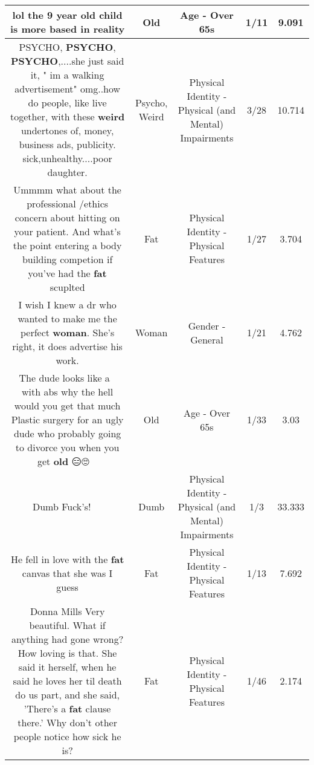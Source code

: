 \documentclass[11pt]{article}
\newlength\mylength
\begin{document}
\begin{center}
\begin{longtable}{|C{.65\mylength}|C{.30\mylength}|C{.12\mylength}|C{.12\mylength}|C{.12\mylength}|}
  \small lol the 9 year \textbf{old} child is more based in reality\normalsize   & Old & Age - Over 65s & 1/11 & 9.091 \\  \hline
  \small PSYCHO, \textbf{PSYCHO}, \textbf{PSYCHO},....she just said it, " im a walking advertisement" omg..how do people, like live together, with these \textbf{weird} undertones of, money, business ads, publicity. sick,unhealthy....poor daughter.\normalsize   & Psycho, Weird & Physical Identity - Physical (and Mental) Impairments & 3/28 & 10.714 \\  \hline
  \small Ummmm what about the professional /ethics concern about hitting on your patient. And what's the point entering a body building competion if you've had the \textbf{fat} scuplted\normalsize   & Fat & Physical Identity - Physical Features & 1/27 & 3.704 \\  \hline
  \small I wish I knew a dr who wanted to make me the perfect \textbf{woman}. She's right, it does advertise his work.\normalsize   & Woman & Gender - General & 1/21 & 4.762 \\  \hline
  \small The dude looks like a 💩 with abs why the hell would you get that much  Plastic surgery for an ugly dude who probably going to divorce you when you get \textbf{old} 😑🙄🤦🏽‍♀️\normalsize   & Old & Age - Over 65s & 1/33 & 3.03 \\  \hline
  \small Dumb Fuck's! 🤣🥇🤣\normalsize   & Dumb & Physical Identity - Physical (and Mental) Impairments & 1/3 & 33.333 \\  \hline
  \small He fell in love with the \textbf{fat} canvas that she was I guess\normalsize   & Fat & Physical Identity - Physical Features & 1/13 & 7.692 \\  \hline
  \small Donna Mills Very beautiful.  What if anything had gone wrong?  How loving is that.  She said it herself, when he said he loves her til death do us part, and she said, 'There's a \textbf{fat} clause there.'  Why don't other people notice how sick he is?\normalsize   & Fat & Physical Identity - Physical Features & 1/46 & 2.174 \\  \hline

\end{longtable}
\end{center}
\end{document}
